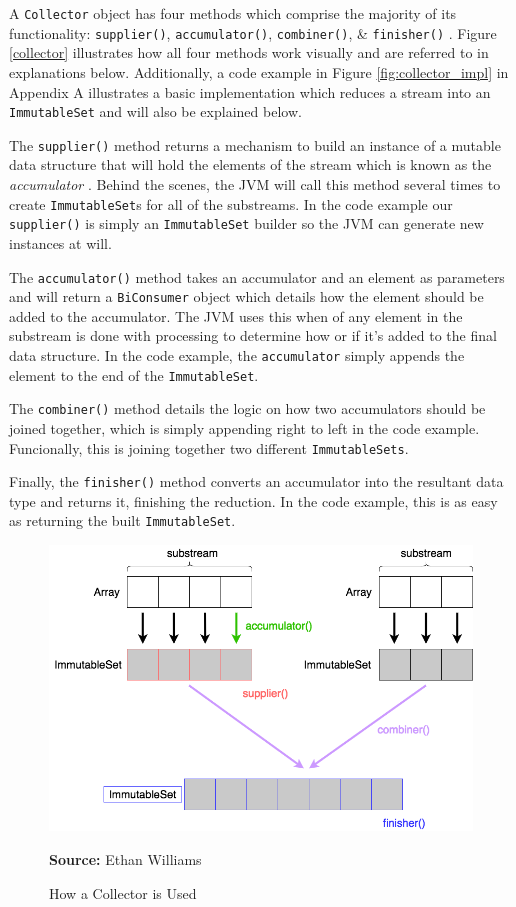 \documentclass[oneside, 12pt]{article}
\newcommand{\source}[1]{\textbf{Source:} {#1} }
\begin{document}

A \verb|Collector| object has four methods which comprise the majority of its functionality: \verb|supplier()|, \verb|accumulator()|, \verb|combiner()|, \& \verb|finisher()| \autocite{collector_doc}. Figure \ref{collector} illustrates how all four methods work visually and are referred to in explanations below. Additionally, a code example in Figure \ref{fig:collector_impl} in Appendix A illustrates a basic implementation which reduces a stream into an \verb|ImmutableSet| and will also be explained below. 

The \verb|supplier()| method returns a mechanism to build an instance of a mutable data structure that will hold the elements of the stream which is known as the \textit{accumulator} \autocite{custom_collector}. Behind the scenes, the JVM will call this method several times to create \verb|ImmutableSet|s for all of the substreams.  In the code example our \verb|supplier()| is simply an \verb|ImmutableSet| builder so the JVM can generate new instances at will.

The \verb|accumulator()| method takes an accumulator and an element as parameters and will return a \verb|BiConsumer| object which details how the element should be added to the accumulator. The JVM uses this when of any element in the substream is done with processing to determine how or if it's added to the final data structure. In the code example, the \verb|accumulator| simply appends the element to the end of the \verb|ImmutableSet|.

The \verb|combiner()| method details the logic on how two accumulators should be joined together, which is simply appending right to left in the code example.  Funcionally, this is joining together two different \verb|ImmutableSets|.

Finally, the \verb|finisher()| method converts an accumulator into the resultant data type and returns it, finishing the reduction. In the code example, this is as easy as returning the built \verb|ImmutableSet|. 

\begin{figure}[H]
\centering
\includegraphics[width=13cm]{images/collector.png}
\caption{How a Collector is Used}
\source{Ethan Williams}
\label{fig:collector}
\end{figure}
\end{document}
